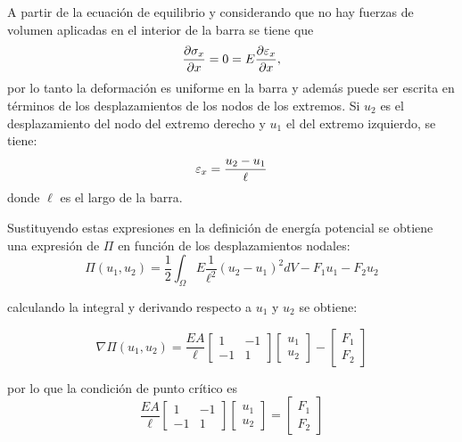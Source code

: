 A partir de la ecuación de equilibrio y considerando que no hay fuerzas de volumen aplicadas en el interior de la barra se tiene que
\begin{equation}
\frac{\partial \sigma_x}{\partial x} = 0 = E \frac{\partial \varepsilon_x}{\partial x},
\end{equation}
por lo tanto la deformación es uniforme en la barra y además puede ser escrita en términos de los desplazamientos de los nodos de los extremos. Si $u_2$ es el desplazamiento del nodo del extremo derecho y $u_1$ el del extremo izquierdo, se tiene:
\begin{equation}
\varepsilon_x = \frac{ u_2-u_1}{\ell}
\end{equation}
donde $\ell$ es el largo de la barra.

Sustituyendo estas expresiones en la definición de energía potencial se obtiene una expresión de $\Pi$ en función de los desplazamientos nodales:
%
\begin{equation}
\Pi(u_1,u_2) = \frac{1}{2} \int_{\Omega} E \frac{1}{\ell^2} (u_2-u_1)^2 dV - F_1 u_1 - F_2  u_2
\end{equation}

calculando la integral y derivando respecto a $u_1$ y $u_2$ se obtiene:

\begin{equation}
\nabla \Pi(u_1,u_2) = 
 \frac{EA}{\ell}
  \left[
\begin{matrix}
1 & -1 \\
-1 & 1 
\end{matrix}\right] 
  \left[
\begin{matrix}
u_1  \\
u_2 
\end{matrix}\right]
- 
  \left[
\begin{matrix}
F_1  \\
F_2 
\end{matrix}\right]
\end{equation}

por lo que la condición de punto crítico es
\begin{equation}\label{eqn:criticoBarra}
 \frac{EA}{\ell}
\left[
\begin{matrix}
1 & -1 \\
-1 & 1 
\end{matrix}\right] 
  \left[
\begin{matrix}
u_1  \\
u_2 
\end{matrix}\right]
= 
\left[
\begin{matrix}
F_1  \\
F_2 
\end{matrix}\right]
\end{equation}

